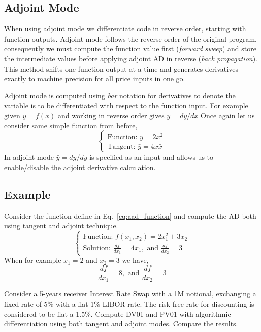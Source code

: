 \documentclass[12pt,a4paper]{article}
\begin{document}
\subsection{Adjoint Mode}
When using adjoint mode we differentiate code in reverse order, starting with function outputs. 
Adjoint mode follows the reverse order of the original program, consequently we must compute the function value first (\emph{forward sweep}) and store the intermediate values before applying adjoint AD in reverse (\emph{back propagation}). This method shifts one function output at a time and generates derivatives exactly to machine precision for all price inputs in one go.

Adjoint mode is computed using \emph{bar} notation for derivatives to denote the variable is to be differentiated with respect to the function input. For example given $y = f(x)$ and working in reverse order gives $\bar{y} = dy/dx$
Once again let us consider same simple function from before,
\begin{equation}
\begin{cases}
\text{Function: } y = 2x^2\\
\text{Tangent: } \bar{y} = 4x\bar{x}
\end{cases}
\end{equation}
In adjoint mode $\bar{y} = dy/dy$ is specified as an input and allows us to enable/disable the adjoint derivative calculation. 

\subsection{Example}
Consider the function define in Eq.~\ref{eq:aad_function} and compute the AD both using tangent and adjoint technique.
\begin{equation}
\begin{cases}
\text{Function: } f(x_1, x_2) = 2x_1^2 + 3x_2\\
\text{Solution: } \frac{df}{dx_1} = 4x_1, \text{ and } \frac{df}{dx_2}=3
\end{cases}
\end{equation}
When for example $x_1=2$ and $x_2 = 3$ we have,
\begin{equation}
\frac{df}{dx_1} = 8, \text{ and } \frac{df}{dx_2}=3
\end{equation}

\begin{question}
Consider a 5-years receiver Interest Rate Swap with a 1M notional, exchanging a fixed rate of 5\% with a flat 1\% LIBOR rate. The risk free rate for discounting is considered to be flat a 1.5\%.
Compute DV01 and PV01 with algorithmic differentiation using both tangent and adjoint modes. Compare the results.
\end{question}
\end{document}
